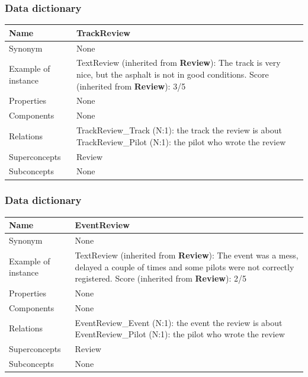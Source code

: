 \documentclass{beamer}
\begin{document}
\begin{frame}
    \frametitle{Data dictionary}
    \begin{table}
    \tiny
    \begin{tabular}{|p{2cm}|p{6cm}|}
    \hline
    Name & \textbf{TrackReview} \\
    \hline
    Synonym & None \\
    \hline
    Example of instance &
    TextReview (inherited from \textbf{Review}): The track is very nice, but the asphalt is not in good conditions. \newline
    Score (inherited from \textbf{Review}): 3/5 \\
    \hline
    Properties & None \\
    \hline
    Components & None \\
    \hline
    Relations &
    TrackReview\_Track (N:1): the track the review is about \newline
    TrackReview\_Pilot (N:1): the pilot who wrote the review \\
    \hline
    Superconcepts & Review \\
    \hline
    Subconcepts & None \\
    \hline
    \end{tabular}
    \end{table}
\end{frame}

\begin{frame}
    \frametitle{Data dictionary}
    \begin{table}
    \tiny
    \begin{tabular}{|p{2cm}|p{6cm}|}
    \hline
    Name & \textbf{EventReview} \\
    \hline
    Synonym & None \\
    \hline
    Example of instance &
    TextReview (inherited from \textbf{Review}): The event was a mess, delayed a couple of times and 
    some pilots were not correctly registered. \newline
    Score (inherited from \textbf{Review}): 2/5 \\
    \hline
    Properties & None \\
    \hline
    Components & None \\
    \hline
    Relations &
    EventReview\_Event (N:1): the event the review is about \newline
    EventReview\_Pilot (N:1): the pilot who wrote the review \\
    \hline
    Superconcepts & Review \\
    \hline
    Subconcepts & None \\
    \hline
    \end{tabular}
    \end{table}
\end{frame}
\end{document}
